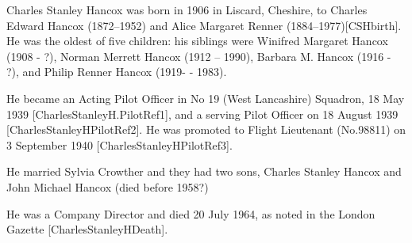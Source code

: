 
Charles Stanley Hancox was born in 1906 in Liscard, Cheshire, to Charles Edward Hancox (1872--1952) and Alice Margaret Renner (1884--1977)[CSHbirth]. He was the oldest of five children: his siblings were Winifred Margaret Hancox (1908 - ?), Norman Merrett Hancox (1912 -- 1990),
Barbara M. Hancox (1916 - ?), and Philip Renner Hancox (1919- - 1983).

He became an Acting Pilot Officer in No 19 (West Lancashire) Squadron, 18 May 1939 [CharlesStanleyH.PilotRef1], and a serving Pilot Officer on 18 August 1939 [CharlesStanleyHPilotRef2].  He was promoted to Flight Lieutenant (No.98811)  on 3 September 1940 [CharlesStanleyHPilotRef3].

He married Sylvia Crowther and they had two sons, Charles Stanley Hancox and 
John Michael Hancox (died before 1958?)
	
 He was a Company Director and died 20 July 1964, as noted in the London Gazette [CharlesStanleyHDeath].
